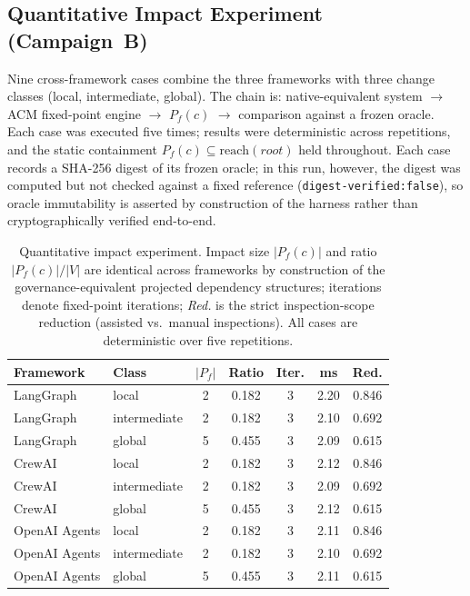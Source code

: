 \documentclass[10pt]{article}
\begin{document}
\subsection{Quantitative Impact Experiment (Campaign~B)}
\label{app:report-impact-quantitative}

Nine cross-framework cases combine the three frameworks with three change
classes (local, intermediate, global). The chain is: native-equivalent
system $\rightarrow$ ACM fixed-point engine $\rightarrow$ $P_f(c)$
$\rightarrow$ comparison against a frozen oracle. Each case was executed
five times; results were deterministic across repetitions, and the static
containment $P_f(c) \subseteq \mathrm{reach}(\mathit{root})$ held
throughout.
Each case records a SHA-256 digest of its frozen oracle; in this run, however, the digest was computed but not checked against a fixed reference (\texttt{digest-verified:false}), so oracle immutability is asserted by construction of the harness rather than cryptographically verified end-to-end.

\begin{table}[htbp]
	\centering
	\caption{Quantitative impact experiment. Impact size $|P_f(c)|$ and
		ratio $|P_f(c)|/|V|$ are identical across frameworks by construction of
		the governance-equivalent projected dependency structures; iterations
		denote fixed-point iterations; \emph{Red.} is the strict inspection-scope
		reduction (assisted vs.\ manual inspections). All cases are deterministic
		over five repetitions.}
	\label{tab:app-impact-quantitative}
	\small
	\begin{tabular}{@{}llccccc@{}}
		\toprule
		\textbf{Framework} & \textbf{Class} & \textbf{$|P_f|$} & \textbf{Ratio} & \textbf{Iter.} & \textbf{ms} & \textbf{Red.} \\
		\midrule
		LangGraph      & local        & 2 & 0.182 & 3 & 2.20 & 0.846 \\
		LangGraph      & intermediate & 2 & 0.182 & 3 & 2.10 & 0.692 \\
		LangGraph      & global       & 5 & 0.455 & 3 & 2.09 & 0.615 \\
		\midrule
		CrewAI         & local        & 2 & 0.182 & 3 & 2.12 & 0.846 \\
		CrewAI         & intermediate & 2 & 0.182 & 3 & 2.09 & 0.692 \\
		CrewAI         & global       & 5 & 0.455 & 3 & 2.12 & 0.615 \\
		\midrule
		OpenAI Agents  & local        & 2 & 0.182 & 3 & 2.11 & 0.846 \\
		OpenAI Agents  & intermediate & 2 & 0.182 & 3 & 2.10 & 0.692 \\
		OpenAI Agents  & global       & 5 & 0.455 & 3 & 2.11 & 0.615 \\
		\bottomrule
	\end{tabular}
\end{table}
\end{document}
